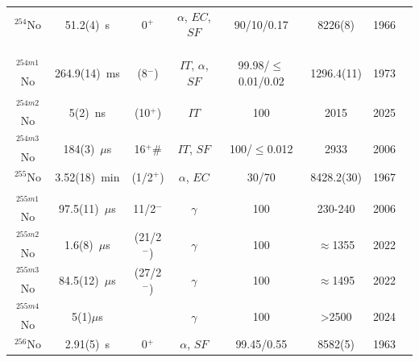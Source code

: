 \begin{center}
\begin{longtable}{c|ccccccl}
$^{254}$No	& 51.2(4)~s		&  0$^+$	&$\alpha$, $EC$, $SF$&90/10/0.17& 8226(8)      		&1966	&{\tiny\cite{Ghiorso1958,Donets1966a,Zager1966,Flerov1968,Ghiorso1973,Hessberger1985}}\\
			&				&			&					&			&				    &		&{\tiny\cite{Tuerler1988,Lazarev1989,Hulet1994,Leino1999,Greenlees2005,Herzberg2006}}\\
			&				&			&					&			&				    &		&{\tiny\cite{Block2010a,Berryman2011,Parr2012,Dworschak2010,Minaya-Ramirez2012,Ito2018}}\\
			&				&			&					&			&				    &		&{\tiny\cite{Raeder2018,Kuznetsova2020,Isaev2021,Forge2023,Wahid2025}}\\
$^{254m1}$No& 264.9(14)~ms	&  (8$^-$)	&$IT$, $\alpha$, $SF$& 99.98/$\leq$0.01/0.02& 1296.4(11)&1973&{\tiny\cite{Ghiorso1973,Herzberg2006,Tandel2006,Clark2010,Hessberger2010,Lopez-Martens2011}}\\
			&				&			&					&			&				    &		&{\tiny\cite{Forge2023,Wahid2025}}\\
$^{254m2}$No& 5(2)~ns	    &  (10$^+$) &$IT$     			&100        & 2015              &2025   &{\tiny\cite{Wahid2025}}\\
$^{254m3}$No& 184(3)~$\mu$s	&  16$^+ \#$&$IT$, $SF$   		&100/$\leq$0.012& 2933          &2006&{\tiny\cite{Herzberg2006,Tandel2006,Clark2010,Hessberger2010,Forge2023,Wahid2025}}\\
$^{255}$No	& 3.52(18)~min	& (1/2$^+$)	&$\alpha$, $EC$	&30/70		& 8428.2(30)		&1967	&{\tiny\cite{Druin1967,Flerov1967a,Ghiorso1967,Flerov1968a,Eskola1970a,Silva1976}}\\
			&				&			&					&			&				&		&{\tiny\cite{Morimoto2004,Morita2004,Hessberger2006a,Haba2008,Asai2011,Bronis2022}}\\
$^{255m1}$No& 97.5(11)~$\mu$s& 11/2$^-$ &$\gamma$			&100		& 230-240			&2006	&{\tiny\cite{Hessberger2006a,Bronis2022}}\\
$^{255m2}$No& 1.6(8)~$\mu$s& (21/2$^-$)&$\gamma$            &100		& $\approx$1355	    &2022	&{\tiny\cite{Bronis2022,Kessaci2024}}\\
$^{255m3}$No& 84.5(12)~$\mu$s	& (27/2$^-$)&$\gamma$		&100		& $\approx$1495		&2022	&{\tiny\cite{Bronis2022,Kessaci2024}}\\
$^{255m4}$No& 5(1)$\mu$s    &           &$\gamma$           &100		& >2500	            &2024	&{\tiny\cite{Kessaci2024}}\\
$^{256}$No	& 2.91(5)~s		&  0$^+$	&$\alpha$, $SF$		&99.45/0.55	& 8582(5)			&1963	&{\tiny\cite{Donets1963,Donets1964,Ghiorso1967,Flerov1968b,Hoffman1990,Asai2016}}\\

\end{longtable}
\end{center}
